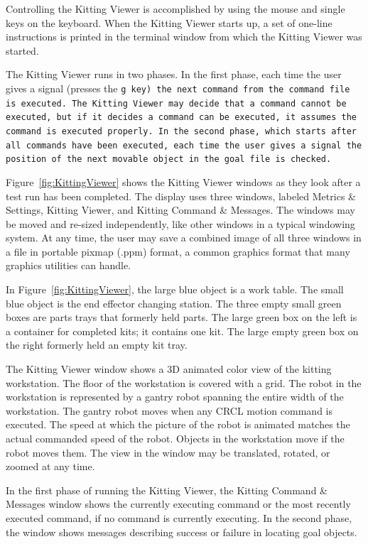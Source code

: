 Controlling the Kitting Viewer is accomplished by using the mouse and single
keys on the keyboard. When the Kitting Viewer starts up, a set of one-line
instructions is printed in the terminal window from which the
Kitting Viewer was started.

The Kitting Viewer runs in two phases. In the first phase, each time the
user gives a signal (presses the \tt g \rm key) the next command from the
command file is executed. The Kitting Viewer may decide that a command
cannot be executed, but if it decides a command can be executed, it assumes
the command is executed properly. In the second phase, which starts after
all commands have been executed, each time the user gives a signal the
position of the next movable object in the goal file is checked.

Figure~\ref{fig:KittingViewer} shows the Kitting Viewer windows as they
look after a test run has been completed. The display uses three windows,
labeled Metrics \& Settings, Kitting Viewer, and Kitting Command \&
Messages. The windows may be moved and re-sized independently, like other
windows in a typical windowing system. At any time, the user may save a
combined image of all three windows in a file in portable pixmap (.ppm)
format, a common graphics format that many graphics utilities can handle.

In Figure~\ref{fig:KittingViewer}, the large blue object is a work table.
The small blue object is the end effector changing station. The three empty
small green boxes are parts trays that formerly held parts. The large green
box on the left is a container for completed kits; it contains one kit. The
large empty green box on the right formerly held an empty kit tray.

The Kitting Viewer window shows a 3D animated color view of the kitting
workstation. The floor of the workstation is covered with a grid. The robot
in the workstation is represented by a gantry robot spanning the entire
width of the workstation. The gantry robot moves when any CRCL motion
command is executed. The speed at which the picture of the robot is
animated matches the actual commanded speed of the robot. Objects in the
workstation move if the robot moves them. The view in the window may be
translated, rotated, or zoomed at any time.

In the first phase of running the Kitting Viewer, the Kitting Command \&
Messages window shows the currently executing command or the most recently
executed command, if no command is currently executing. In the second
phase, the window shows messages describing success or failure in locating
goal objects.

